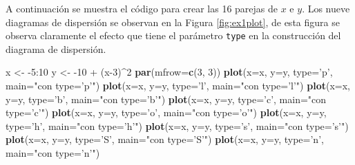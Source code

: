 \documentclass[10pt,]{krantz}
\makeatletter
\newenvironment{Shaded}{\begin{snugshade}}{\end{snugshade}}
\newcommand{\KeywordTok}[1]{\textcolor[rgb]{0.13,0.29,0.53}{\textbf{{#1}}}}
\newcommand{\DataTypeTok}[1]{\textcolor[rgb]{0.13,0.29,0.53}{{#1}}}
\newcommand{\DecValTok}[1]{\textcolor[rgb]{0.00,0.00,0.81}{{#1}}}
\newcommand{\StringTok}[1]{\textcolor[rgb]{0.31,0.60,0.02}{{#1}}}
\newcommand{\NormalTok}[1]{{#1}}
\newenvironment{kframe}{%
\medskip{}
\setlength{\fboxsep}{.8em}
 \def\at@end@of@kframe{}%
 \ifinner\ifhmode%
  \def\at@end@of@kframe{\end{minipage}}%
  \begin{minipage}{\columnwidth}%
 \fi\fi%
 \def\FrameCommand##1{\hskip\@totalleftmargin \hskip-\fboxsep
 \colorbox{shadecolor}{##1}\hskip-\fboxsep
     \hskip-\linewidth \hskip-\@totalleftmargin \hskip\columnwidth}%
 \MakeFramed {\advance\hsize-\width
   \@totalleftmargin\z@ \linewidth\hsize
   \@setminipage}}%
 {\par\unskip\endMakeFramed%
 \at@end@of@kframe}
\renewenvironment{Shaded}{\begin{kframe}}{\end{kframe}}
\makeatother
\begin{document}
A continuación se muestra el código para crear las 16 parejas de \(x\) e
\(y\). Los nueve diagramas de dispersión se observan en la Figura
\ref{fig:ex1plot}, de esta figura se observa claramente el efecto que
tiene el parámetro \texttt{type} en la construcción del diagrama de
dispersión.

\begin{Shaded}
\begin{Highlighting}[]
\NormalTok{x <-}\StringTok{ }\NormalTok{-}\DecValTok{5}\NormalTok{:}\DecValTok{10}
\NormalTok{y <-}\StringTok{ }\NormalTok{-}\DecValTok{10} \NormalTok{+}\StringTok{ }\NormalTok{(x}\DecValTok{-3}\NormalTok{)^}\DecValTok{2}
\KeywordTok{par}\NormalTok{(}\DataTypeTok{mfrow=}\KeywordTok{c}\NormalTok{(}\DecValTok{3}\NormalTok{, }\DecValTok{3}\NormalTok{))}
\KeywordTok{plot}\NormalTok{(}\DataTypeTok{x=}\NormalTok{x, }\DataTypeTok{y=}\NormalTok{y, }\DataTypeTok{type=}\StringTok{'p'}\NormalTok{, }\DataTypeTok{main=}\StringTok{"con type='p'"}\NormalTok{)}
\KeywordTok{plot}\NormalTok{(}\DataTypeTok{x=}\NormalTok{x, }\DataTypeTok{y=}\NormalTok{y, }\DataTypeTok{type=}\StringTok{'l'}\NormalTok{, }\DataTypeTok{main=}\StringTok{"con type='l'"}\NormalTok{)}
\KeywordTok{plot}\NormalTok{(}\DataTypeTok{x=}\NormalTok{x, }\DataTypeTok{y=}\NormalTok{y, }\DataTypeTok{type=}\StringTok{'b'}\NormalTok{, }\DataTypeTok{main=}\StringTok{"con type='b'"}\NormalTok{)}
\KeywordTok{plot}\NormalTok{(}\DataTypeTok{x=}\NormalTok{x, }\DataTypeTok{y=}\NormalTok{y, }\DataTypeTok{type=}\StringTok{'c'}\NormalTok{, }\DataTypeTok{main=}\StringTok{"con type='c'"}\NormalTok{)}
\KeywordTok{plot}\NormalTok{(}\DataTypeTok{x=}\NormalTok{x, }\DataTypeTok{y=}\NormalTok{y, }\DataTypeTok{type=}\StringTok{'o'}\NormalTok{, }\DataTypeTok{main=}\StringTok{"con type='o'"}\NormalTok{)}
\KeywordTok{plot}\NormalTok{(}\DataTypeTok{x=}\NormalTok{x, }\DataTypeTok{y=}\NormalTok{y, }\DataTypeTok{type=}\StringTok{'h'}\NormalTok{, }\DataTypeTok{main=}\StringTok{"con type='h'"}\NormalTok{)}
\KeywordTok{plot}\NormalTok{(}\DataTypeTok{x=}\NormalTok{x, }\DataTypeTok{y=}\NormalTok{y, }\DataTypeTok{type=}\StringTok{'s'}\NormalTok{, }\DataTypeTok{main=}\StringTok{"con type='s'"}\NormalTok{)}
\KeywordTok{plot}\NormalTok{(}\DataTypeTok{x=}\NormalTok{x, }\DataTypeTok{y=}\NormalTok{y, }\DataTypeTok{type=}\StringTok{'S'}\NormalTok{, }\DataTypeTok{main=}\StringTok{"con type='S'"}\NormalTok{)}
\KeywordTok{plot}\NormalTok{(}\DataTypeTok{x=}\NormalTok{x, }\DataTypeTok{y=}\NormalTok{y, }\DataTypeTok{type=}\StringTok{'n'}\NormalTok{, }\DataTypeTok{main=}\StringTok{"con type='n'"}\NormalTok{)}
\end{Highlighting}
\end{Shaded}
\end{document}
